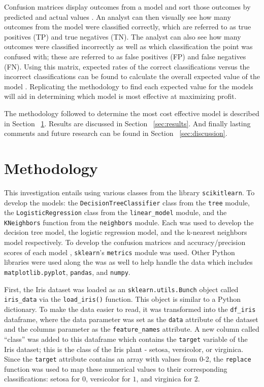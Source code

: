 \documentclass[journal]{IEEEtran}
\begin{document}
Confusion matrices display outcomes from a model and sort those outcomes by predicted and actual values \cite{b4}. An analyst can then visually see how many outcomes from the model were classified correctly, which are referred to as true positives (TP) and true negatives (TN). The analyst can also see how many outcomes were classified incorrectly as well as which classification the point was confused with; these are referred to as false positives (FP) and false negatives (FN). Using this matrix, expected rates of the correct classifications versus the incorrect classifications can be found to calculate the overall expected value of the model \cite{b5}. Replicating the methodology to find each expected value for the models will aid in determining which model is most effective at maximizing profit. 

The methodology followed to determine the most cost effective model is described in Section ~\ref{sec:methodology}. Results are discussed in Section ~\ref{sec:results}. And finally lasting comments and future research can be found in Section ~\ref{sec:discussion}.


\section{Methodology}
\label{sec:methodology}

This investigation entails using various classes from the library \lstinline{scikitlearn}. To develop the models: the \lstinline{DecisionTreeClassifier} class from the \lstinline{tree} module, the \lstinline{LogisticRegression} class from the \lstinline{linear_model} module, and the \lstinline{KNeighbors} function from the \lstinline{neighbors} module. Each was used to develop the decision tree model, the logistic regression model, and the k-nearest neighbors model respectively. To develop the confusion matrices and accuracy/precision scores of each model ,  \lstinline{sklearn}'s \lstinline{metrics} module was used. Other Python libraries were used along the was as well to help handle the data which includes \lstinline{matplotlib.pyplot}, \lstinline{pandas}, and \lstinline{numpy}. 

First, the Iris dataset was loaded as an \lstinline{sklearn.utils.Bunch} object called \lstinline{iris_data} via the \lstinline{load_iris()} function. This object is similar to a Python dictionary. To make the data easier to read, it was transformed into the \lstinline{df_iris} dataframe, where the data parameter was set as the \lstinline{data} attribute of the dataset and the columns parameter as the \lstinline{feature_names} attribute. A new column called “class” was added to this dataframe which contains the \lstinline{target} variable of the Iris dataset; this is the class of the Iris plant - setosa, versicolor, or virginica. Since the \lstinline{target} attribute contains an array with values from 0-2, the \lstinline{replace} function was used to map these numerical values to their corresponding classifications: setosa for \(0\), versicolor for \(1\), and virginica for \(2\). 
\end{document}
